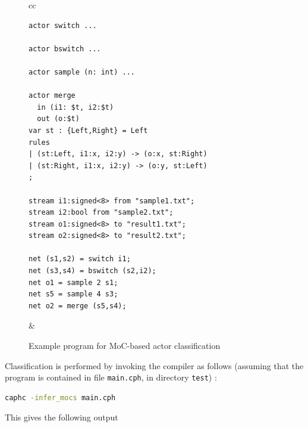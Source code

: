 \lstset{frame=none}
\begin{figure}[h]
  \centering
\begin{tabular}[c]{cc}
  \begin{minipage}{0.5\textwidth}
\begin{lstlisting}[basicstyle=\small]
actor switch ... 

actor bswitch ...

actor sample (n: int) ...

actor merge 
  in (i1: $t, i2:$t)
  out (o:$t)
var st : {Left,Right} = Left
rules
| (st:Left, i1:x, i2:y) -> (o:x, st:Right)
| (st:Right, i1:x, i2:y) -> (o:y, st:Left)
;

stream i1:signed<8> from "sample1.txt";
stream i2:bool from "sample2.txt";
stream o1:signed<8> to "result1.txt";
stream o2:signed<8> to "result2.txt";

net (s1,s2) = switch i1;
net (s3,s4) = bswitch (s2,i2);
net o1 = sample 2 s1;
net s5 = sample 4 s3;
net o2 = merge (s5,s4);
\end{lstlisting}
  \end{minipage} &
\end{tabular}
  \caption{Example program for MoC-based actor classification}
  \label{fig:act-class-ex}
\end{figure}
\lstset{frame=single}


Classification is performed by invoking the compiler as follows (assuming that the program is
contained in file \verb|main.cph|, in directory \verb|test|) :

\begin{lstlisting}[language=bash]
caphc -infer_mocs main.cph
\end{lstlisting}

\noindent
This gives the following output 

